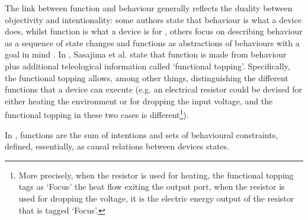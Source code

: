 \documentclass[sw]{iosart2x}
\newcommand{\quotes}[1]{`#1'}
\newcommand{\TODO}[1]{{\color{red} #1
}}
\newcommand{\TODOinline}[1]{{\color{red} #1
}}
\newcommand{\myComment}[1]{{\unskip \ignorespaces}}
\begin{document}
The link between function and behaviour generally reflects the duality between objectivity and intentionality: some authors state that behaviour is what a device does, whilst function is what a device is for \cite{kleer_qualitative_1984}, others focus on describing behaviour as a sequence of state changes and functions as abstractions of behaviours with a goal in mind \cite{umedaFunctionBehaviourStructure1990}.  
In \cite{sasajimaFBRLFunctionBehavior1995, sasajimaInvestigationDomainOntology1994}, Sasajima et al. state that function is made from behaviour plus additional teleological information called \quotes{functional topping}.
Specifically, the functional topping allows, among other things, distinguishing the different functions that a device can execute (e.g. an electrical resistor could be devised for either heating the environment or for dropping the input voltage, and the functional topping in these two cases is different\myComment{a heat exchanger could be devised for either heating or cooling depending on the context, and the functional topping in these two cases is different}\footnote{More precisely, when the resistor is used for heating, the functional topping tags as `Focus' the heat flow exiting the output port, when the resistor is used for dropping the voltage, it is the electric energy output of the resistor that is tagged `Focus'.}).

In \cite{chandrasekaranFunctionDeviceRepresentation2000}, functions are the sum of intentions and sets of behavioural constraints, defined, essentially, as causal relations between devices states.

\end{document}
